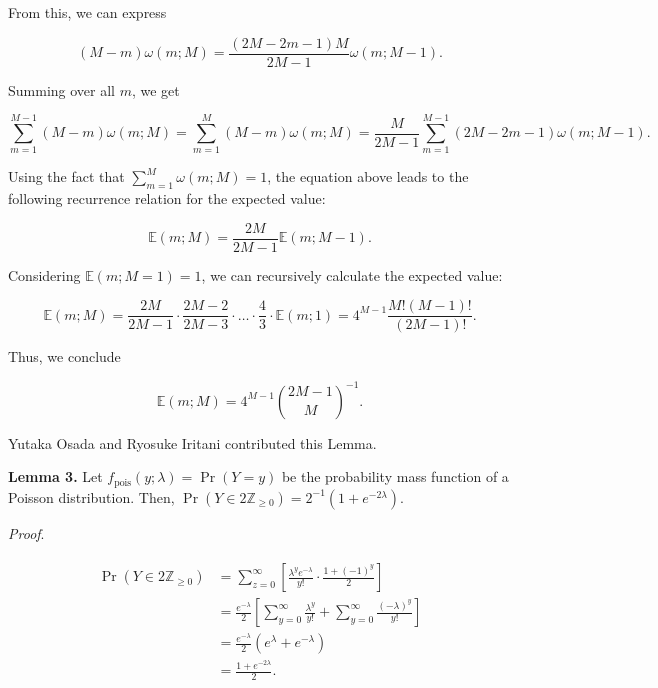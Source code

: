 \documentclass[11pt, class=article, crop=false]{standalone}
\begin{document}
From this, we can express

\begin{equation}
    (M - m) \omega(m; M) = \frac{(2M - 2m - 1) M}{2M - 1} \omega(m; M - 1).
\end{equation}

Summing over all $m$, we get

\begin{equation}
    \sum_{m = 1}^{M - 1} (M - m) \omega(m; M)
    = \sum_{m = 1}^{M} (M - m) \omega(m; M)
    = \frac{M}{2M - 1} \sum_{m = 1}^{M - 1} (2M - 2m - 1) \omega(m; M - 1).
\end{equation}

Using the fact that $\sum_{m = 1}^{M} \omega(m; M) = 1$, the equation above leads to the following recurrence relation for the expected value:

\begin{equation}
    \mathbb{E}(m; M) = \frac{2M}{2M - 1} \mathbb{E}(m; M - 1).
\end{equation}

Considering $\mathbb{E}(m; M = 1) = 1$, we can recursively calculate the expected value:

\begin{equation}
    \mathbb{E}(m; M) = \frac{2M}{2M - 1} \cdot \frac{2M - 2}{2M - 3} \cdot \ldots \cdot \frac{4}{3} \cdot \mathbb{E}(m; 1) = 4^{M - 1} \frac{M!(M - 1)!}{(2M - 1)!}.
\end{equation}

Thus, we conclude

\begin{equation}
    \mathbb{E}(m; M) = 4^{M - 1} \binom{2M - 1}{M}^{-1}.
\end{equation}

Yutaka Osada and Ryosuke Iritani contributed this Lemma.

\textbf{Lemma 3.} Let $f_{\text{pois}}(y; \lambda) = \Pr(Y = y)$ be the probability mass function of a Poisson distribution.
Then, $\Pr(Y \in 2\mathbb{Z}_{\ge 0}) = 2^{-1}(1 + e^{- 2 \lambda})$.

\textit{Proof}.

\begin{align}
    \begin{split}
        \Pr(Y \in 2\mathbb{Z}_{\ge 0}) 
        &= \sum_{z = 0}^{\infty} \left[ \frac{\lambda^{y} e^{-\lambda}}{y!} \cdot \frac{1 + (-1)^{y}}{2} \right]\\
        &= \frac{e^{-\lambda}}{2} \left[ \sum_{y = 0}^{\infty} \frac{\lambda^{y}}{y!} + \sum_{y = 0}^{\infty} \frac{(-\lambda)^{y}}{y!}\right]\\
        &= \frac{e^{-\lambda}}{2} (e^{\lambda} + e^{-\lambda})\\
        &= \frac{1 + e^{- 2 \lambda}}{2}.
    \end{split}
\end{align}
\end{document}

